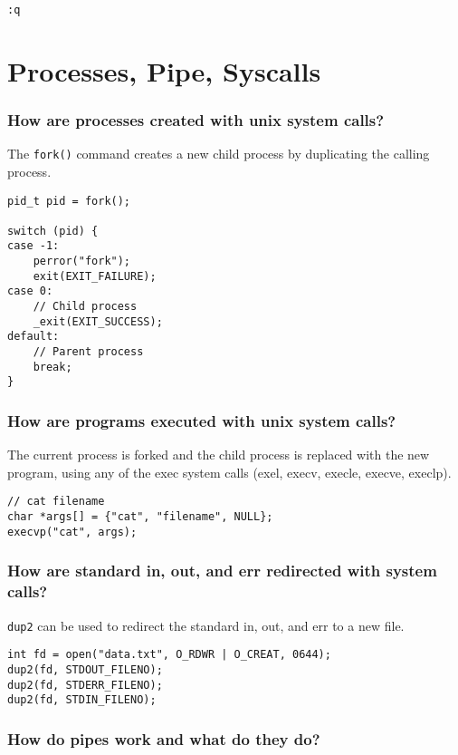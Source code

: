 \documentclass{article}
\newcommand{\inlinecode}[1]{\colorbox{gray!20}{\texttt{#1}}}
\begin{document}
\inlinecode{:q}

\section*{Processes, Pipe, Syscalls}

\subsubsection*{How are processes created with unix system calls?}

The \inlinecode{fork()} command creates a new child process by duplicating the calling process.

\begin{verbatim}
pid_t pid = fork();

switch (pid) {
case -1:
    perror("fork");
    exit(EXIT_FAILURE);
case 0:
    // Child process
    _exit(EXIT_SUCCESS);
default:
    // Parent process
    break;
}
\end{verbatim}

\subsubsection*{How are programs executed with unix system calls?}

The current process is forked and the child process is replaced with the new program, using any of the exec system calls (exel, execv, execle, execve, execlp).

\begin{verbatim}
// cat filename
char *args[] = {"cat", "filename", NULL};
execvp("cat", args);
\end{verbatim}

\subsubsection*{How are standard in, out, and err redirected with system calls?}

\inlinecode{dup2} can be used to redirect the standard in, out, and err to a new file.

\begin{verbatim}
int fd = open("data.txt", O_RDWR | O_CREAT, 0644);
dup2(fd, STDOUT_FILENO);
dup2(fd, STDERR_FILENO);
dup2(fd, STDIN_FILENO);
\end{verbatim}

\subsubsection*{How do pipes work and what do they do?}
\end{document}
